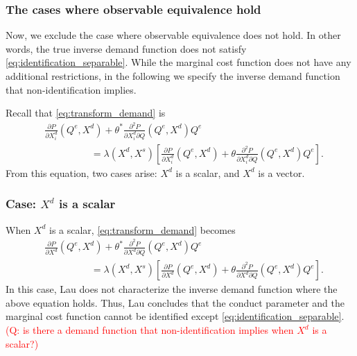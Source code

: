 \documentclass[11pt, a4paper]{article}
\theoremstyle{remark}
\begin{document}
\subsubsection{The cases where observable equivalence hold}
Now, we exclude the case where observable equivalence does not hold.
In other words, the true inverse demand function does not satisfy \eqref{eq:identification_separable}.
While the marginal cost function does not have any additional restrictions, in the following we specify the inverse demand function that non-identification implies.

Recall that \eqref{eq:transform_demand} is
\begin{align}
    &\frac{\partial P}{\partial X^{d}_{i}}(Q^e, X^{d}) + \theta^{*}\frac{\partial^2 P}{\partial X^{d}_{i}\partial Q}(Q^e, X^{d})Q^e \\
    &\hspace{2cm} = \lambda(X^{d}, X^{s})\left[\frac{\partial P}{\partial X^{d}_{i}} (Q^e, X^{d})+ \theta \frac{\partial^2 P}{\partial X^{d}_{i}\partial Q}(Q^e, X^{d})Q^e\right].
\end{align}
From this equation, two cases arise: $X^{d}$ is a scalar, and $X^{d}$ is a vector.

\subsubsection*{Case: $X^{d}$ is a scalar}
When $X^{d}$ is a scalar,  \eqref{eq:transform_demand} becomes
\begin{align}
    &\frac{\partial P}{\partial X^{d}}(Q^e, X^{d}) + \theta^{*}\frac{\partial^2 P}{\partial X^{d}\partial Q}(Q^e, X^{d})Q^e \\
    &\hspace{2cm} = \lambda(X^{d}, X^{s})\left[\frac{\partial P}{\partial X^{d}} (Q^e, X^{d})+ \theta \frac{\partial^2 P}{\partial X^{d}\partial Q}(Q^e, X^{d})Q^e\right].
\end{align}
In this case, Lau does not characterize the inverse demand function where the above equation holds.
Thus, Lau concludes that the conduct parameter and the marginal cost function cannot be identified except \eqref{eq:identification_separable}.
\textcolor{red}{(Q: is there a demand function that non-identification implies when $X^{d}$ is a scalar?)}
\end{document}
